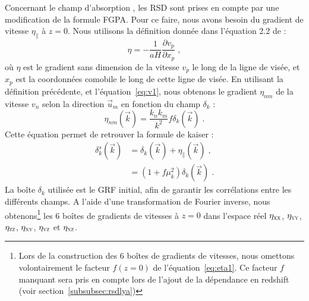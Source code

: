 \documentclass[11pt, twoside, a4paper, openright]{report}
\begin{document}

Concernant le champ d'absorption \lya{}, les RSD sont prises en compte par une modification de la formule FGPA. Pour ce faire, nous avons besoin du gradient de vitesse $\eta_{\parallel}$ à $z=0$.
Nous utilisons la définition donnée dans l'équation 2.2 de \textcite{Arinyo-i-Prats2015} :
\begin{equation}
  \eta = - \frac{1}{aH} \frac{\partial v_p}{\partial x_p} \; ,
\end{equation}
où $\eta$ est le gradient sans dimension de la vitesse $v_p$ le long de la ligne de visée, et $x_p$ est la coordonnées comobile le long de cette ligne de visée.
En utilisant la définition précédente, et l'équation~\ref{eq:v1}, nous obtenons le gradient $\eta_{nm}$ de la vitesse $v_n$ selon la direction $\vec u_m$ en fonction du champ $\delta_k$ :
\begin{equation}
  \label{eq:eta1}
  \eta_{nm}(\vec k) = \frac{k_n k_m}{k^2} f \delta_k(\vec k) \; .
\end{equation}
Cette équation permet de retrouver la formule de kaiser :
\begin{align}
  \label{eq:kaiser5}
  \delta_k^s(\vec k) &= \delta_k(\vec k) + \eta_{\parallel}(\vec k) \; ,   \\
                     &= (1 + f \mu_k^2) \delta_k(\vec k)  \; .  \nonumber
\end{align}
  La boîte $\delta_k$ utilisée est le GRF initial, afin de garantir les corrélations entre les différents champs. A l'aide d'une transformation de Fourier inverse, nous obtenons\footnote{Lors de la construction des 6 boîtes de gradients de vitesses, nous omettons volontairement le facteur $f(z=0)$ de l'équation~\ref{eq:eta1}. Ce facteur $f$ manquant sera pris en compte lors de l'ajout de la dépendance en redshift (voir section~\ref{subsubsec:rsdlya})} les 6 boîtes de gradients de vitesses  à $z = 0$ dans l'espace réel $\eta_{\textsc{xx}}$, $\eta_{\textsc{yy}}$, $\eta_{\textsc{zz}}$, $\eta_{\textsc{xy}}$, $\eta_{\textsc{yz}}$ et $\eta_{\textsc{xz}}$.
\end{document}
